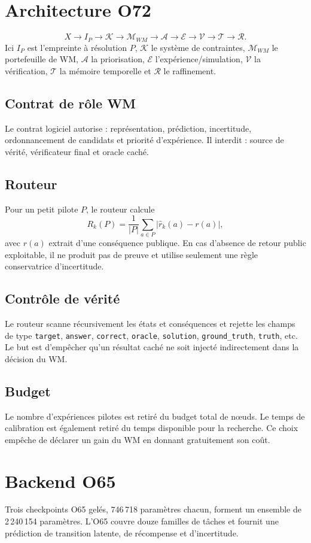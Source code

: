 \documentclass[11pt,a4paper]{article}
\begin{document}
\section{Architecture O72}
\[
X \rightarrow I_P \rightarrow \mathcal K \rightarrow \mathcal M_{WM} \rightarrow \mathcal A \rightarrow \mathcal E \rightarrow \mathcal V \rightarrow \mathcal T \rightarrow \mathcal R.
\]
Ici $I_P$ est l'empreinte à résolution $P$, $\mathcal K$ le système de contraintes, $\mathcal M_{WM}$ le portefeuille de WM, $\mathcal A$ la priorisation, $\mathcal E$ l'expérience/simulation, $\mathcal V$ la vérification, $\mathcal T$ la mémoire temporelle et $\mathcal R$ le raffinement.
\subsection{Contrat de rôle WM}
Le contrat logiciel autorise : représentation, prédiction, incertitude, ordonnancement de candidats et priorité d'expérience. Il interdit : source de vérité, vérificateur final et oracle caché.
\subsection{Routeur}
Pour un petit pilote $P$, le routeur calcule
\[
R_k(P)=\frac1{|P|}\sum_{a\in P}|\hat r_k(a)-r(a)|,
\]
avec $r(a)$ extrait d'une conséquence publique. En cas d'absence de retour public exploitable, il ne produit pas de preuve et utilise seulement une règle conservatrice d'incertitude.
\subsection{Contrôle de vérité}
Le routeur scanne récursivement les états et conséquences et rejette les champs de type \texttt{target}, \texttt{answer}, \texttt{correct}, \texttt{oracle}, \texttt{solution}, \texttt{ground\_truth}, \texttt{truth}, etc. Le but est d'empêcher qu'un résultat caché ne soit injecté indirectement dans la décision du WM.
\subsection{Budget}
Le nombre d'expériences pilotes est retiré du budget total de nœuds. Le temps de calibration est également retiré du temps disponible pour la recherche. Ce choix empêche de déclarer un gain du WM en donnant gratuitement son coût.
\section{Backend O65}
Trois checkpoints O65 gelés, 746\,718 paramètres chacun, forment un ensemble de 2\,240\,154 paramètres. L'O65 couvre douze familles de tâches et fournit une prédiction de transition latente, de récompense et d'incertitude.
\end{document}
